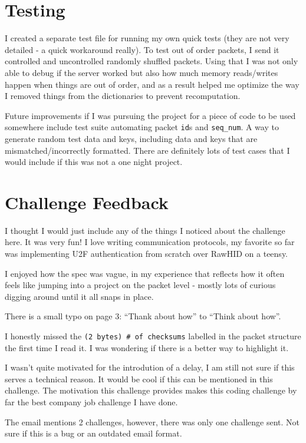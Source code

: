 \documentclass[acmtog,review]{acmart}
\begin{document}
\section{Testing}

I created a separate test file for running my own quick tests 
(they are not very detailed - a quick workaround really).
To test out of order packets, I send it controlled and uncontrolled
randomly shuffled packets. Using that I was not only able to
debug if the server worked but also how much memory reads/writes
happen when things are out of order, and as a result helped me
optimize the way I removed things from the dictionaries to prevent
recomputation.

Future improvements if I was pursuing the project for a piece of code
to be used somewhere include test suite automating packet \texttt{id}s and 
\texttt{seq\_num}. A way to generate random test data and keys, including
data and keys that are mismatched/incorrectly formatted. There are definitely
lots of test cases that I would include if this was not a one night project.

\section{Challenge Feedback}

I thought I would just include any of the things I noticed
about the challenge here. It was very fun! I love writing
communication protocols, my favorite so far was implementing
U2F authentication from scratch over RawHID on a teensy.

I enjoyed how the spec was vague, in my experience that
reflects how it often feels like jumping into a project
on the packet level - mostly lots of curious digging 
around until it all snaps in place.

There is a small typo on page 3: ``Thank about how'' to 
``Think about how''.

I honestly missed the \texttt{(2 bytes) \# of checksums}
labelled in the packet structure the first time I read it.
I was wondering if there is a better way to highlight it.

I wasn't quite motivated for the introdution of a delay,
I am still not sure if this serves a technical reason. It
would be cool if this can be mentioned in this challenge.
The motivation this challenge provides makes this
coding challenge by far the best company job challenge
I have done.

The email mentions 2 challenges, however, there was only
one challenge sent. Not sure if this is a bug or an 
outdated email format.
\end{document}
